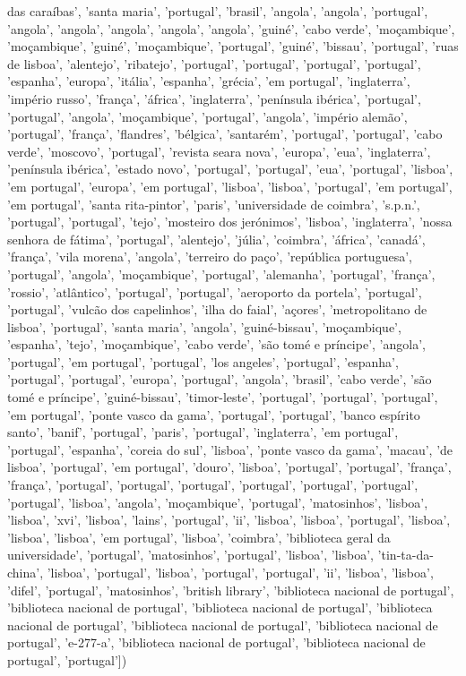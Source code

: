 \documentclass{article}
\begin{document}
\begin{itemize}
das caraíbas', 'santa maria', 'portugal', 'brasil', 'angola', 'angola', 'portugal', 'angola', 'angola', 'angola', 'angola', 'angola', 'guiné', 'cabo verde', 'moçambique', 'moçambique', 'guiné', 'moçambique', 'portugal', 'guiné', 'bissau', 'portugal', 'ruas de lisboa', 'alentejo', 'ribatejo', 'portugal', 'portugal', 'portugal', 'portugal', 'espanha', 'europa', 'itália', 'espanha', 'grécia', 'em portugal', 'inglaterra', 'império russo', 'frança', 'áfrica', 'inglaterra', 'península ibérica', 'portugal', 'portugal', 'angola', 'moçambique', 'portugal', 'angola', 'império alemão', 'portugal', 'frança', 'flandres', 'bélgica', 'santarém', 'portugal', 'portugal', 'cabo verde', 'moscovo', 'portugal', 'revista seara nova', 'europa', 'eua', 'inglaterra', 'península ibérica', 'estado novo', 'portugal', 'portugal', 'eua', 'portugal', 'lisboa', 'em portugal', 'europa', 'em portugal', 'lisboa', 'lisboa', 'portugal', 'em portugal', 'em portugal', 'santa rita-pintor', 'paris', 'universidade de coimbra', 's.p.n.', 'portugal', 'portugal', 'tejo', 'mosteiro dos jerónimos', 'lisboa', 'inglaterra', 'nossa senhora de fátima', 'portugal', 'alentejo', 'júlia', 'coimbra', 'áfrica', 'canadá', 'frança', 'vila morena', 'angola', 'terreiro do paço', 'república portuguesa', 'portugal', 'angola', 'moçambique', 'portugal', 'alemanha', 'portugal', 'frança', 'rossio', 'atlântico', 'portugal', 'portugal', 'aeroporto da portela', 'portugal', 'portugal', 'vulcão dos capelinhos', 'ilha do faial', 'açores', 'metropolitano de lisboa', 'portugal', 'santa maria', 'angola', 'guiné-bissau', 'moçambique', 'espanha', 'tejo', 'moçambique', 'cabo verde', 'são tomé e príncipe', 'angola', 'portugal', 'em portugal', 'portugal', 'los angeles', 'portugal', 'espanha', 'portugal', 'portugal', 'europa', 'portugal', 'angola', 'brasil', 'cabo verde', 'são tomé e príncipe', 'guiné-bissau', 'timor-leste', 'portugal', 'portugal', 'portugal', 'em portugal', 'ponte vasco da gama', 'portugal', 'portugal', 'banco espírito santo', 'banif', 'portugal', 'paris', 'portugal', 'inglaterra', 'em portugal', 'portugal', 'espanha', 'coreia do sul', 'lisboa', 'ponte vasco da gama', 'macau', 'de lisboa', 'portugal', 'em portugal', 'douro', 'lisboa', 'portugal', 'portugal', 'frança', 'frança', 'portugal', 'portugal', 'portugal', 'portugal', 'portugal', 'portugal', 'portugal', 'lisboa', 'angola', 'moçambique', 'portugal', 'matosinhos', 'lisboa', 'lisboa', 'xvi', 'lisboa', 'lains', 'portugal', 'ii', 'lisboa', 'lisboa', 'portugal', 'lisboa', 'lisboa', 'lisboa', 'em portugal', 'lisboa', 'coimbra', 'biblioteca geral da universidade', 'portugal', 'matosinhos', 'portugal', 'lisboa', 'lisboa', 'tin-ta-da-china', 'lisboa', 'portugal', 'lisboa', 'portugal', 'portugal', 'ii', 'lisboa', 'lisboa', 'difel', 'portugal', 'matosinhos', 'british library', 'biblioteca nacional de portugal', 'biblioteca nacional de portugal', 'biblioteca nacional de portugal', 'biblioteca nacional de portugal', 'biblioteca nacional de portugal', 'biblioteca nacional de portugal', 'e-277-a', 'biblioteca nacional de portugal', 'biblioteca nacional de portugal', 'portugal'])

\end{itemize}
\end{document}
